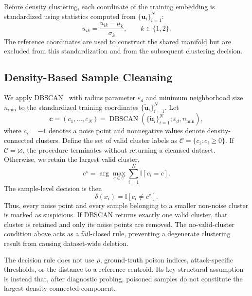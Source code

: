 \documentclass[10pt,journal]{IEEEtran}
\begin{document}
Before density clustering, each coordinate of the training embedding
is standardized using statistics computed from
$\{\mathbf{u}_i\}_{i=1}^{N}$:
\begin{equation}
    \widetilde{u}_{ik}
    =
    \frac{u_{ik}-\mu_k}{\sigma_k},
    \qquad k\in\{1,2\}.
    \label{eq:umap_standardization}
\end{equation}
The reference coordinates are used to construct the shared manifold
but are excluded from this standardization and from the subsequent
clustering decision.

\subsection{Density-Based Sample Cleansing}
\label{sec:density_cleansing}

We apply DBSCAN~\cite{Ester1996DBSCAN} with radius parameter
$\varepsilon_{d}$ and minimum neighborhood size $n_{\min}$ to the
standardized training coordinates
$\{\widetilde{\mathbf{u}}_i\}_{i=1}^{N}$. Let
\begin{equation}
    \mathbf{c}=(c_1,\ldots,c_N)
    =
    \operatorname{DBSCAN}
    (\{\widetilde{\mathbf{u}}_i\}_{i=1}^{N};
    \varepsilon_d,n_{\min}),
    \label{eq:dbscan_assignment}
\end{equation}
where $c_i=-1$ denotes a noise point and nonnegative values denote
density-connected clusters. Define the set of valid cluster labels as
$\mathcal{C}=\{c_i:c_i\geq0\}$. If $\mathcal{C}=\varnothing$, the
procedure terminates without returning a cleansed dataset. Otherwise,
we retain the largest valid cluster,
\begin{equation}
    c^{\star}
    =
    \arg\max_{c\in\mathcal{C}}
    \sum_{i=1}^{N}\mathbb{I}[c_i=c].
    \label{eq:largest_cluster}
\end{equation}
The sample-level decision is then
\begin{equation}
    \delta(x_i)
    =
    \mathbb{I}[c_i\neq c^{\star}].
    \label{eq:cleansing_decision}
\end{equation}
Thus, every noise point and every sample belonging to a smaller
non-noise cluster is marked as suspicious. If DBSCAN returns exactly
one valid cluster, that cluster is retained and only its noise points
are removed. The no-valid-cluster condition above acts as a fail-closed
rule, preventing a degenerate clustering result from causing
dataset-wide deletion.

The decision rule does not use $\rho$, ground-truth poison indices,
attack-specific thresholds, or the distance to a reference centroid.
Its key structural assumption is instead that, after diagnostic
probing, poisoned samples do not constitute the largest
density-connected component.
\end{document}
